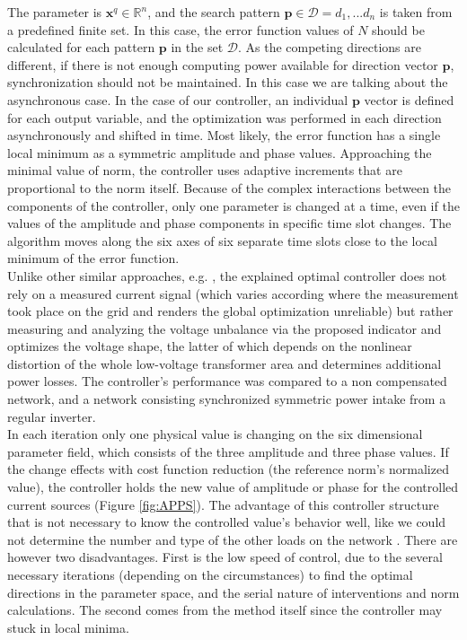         The parameter is $\textbf{x}^q\in\mathbb{R}^n$, and the  search pattern $\textbf{p}\in\mathcal{D}={d_1,...d_n}$ is taken from a predefined finite set. In this case, the error function values of $N$ should be calculated for each pattern $\textbf{p}$ in the set $\mathcal{D}$. As the competing directions are different, if there is not enough computing power available for direction vector $\textbf{p}$, synchronization should not be maintained. In this case we are talking about the asynchronous case. In the case of our controller, an individual $\textbf{p}$ vector is defined for each output variable, and the optimization was performed in each direction asynchronously and shifted in time. Most likely, the error function has a single local minimum as a symmetric amplitude and phase values. Approaching the minimal value of norm, the controller uses adaptive increments that are proportional to the norm itself. Because of the complex interactions between the components of the controller, only one parameter is changed at a time, even if the values of the amplitude and phase components in specific time slot changes. The algorithm moves along the six axes of six separate time slots close to the local minimum of the error function.\\
        Unlike other similar approaches, e.g. \cite{segui2007approach}, the explained optimal controller does not rely on a measured current signal (which varies according where the measurement took place on the grid and renders the global optimization unreliable) but rather measuring and analyzing the voltage unbalance via the proposed indicator and optimizes the voltage shape, the latter of which depends on the nonlinear distortion of the whole low-voltage transformer area and determines additional power losses. The controller's performance was compared to a non compensated network, and a network consisting synchronized symmetric power intake from a regular inverter.\\
        In each iteration only one physical value is changing on the six dimensional parameter field, which consists of the three amplitude and three phase values. If the change effects with cost function reduction (the reference norm's normalized value), the controller holds the new value of amplitude or phase for the controlled current sources (Figure \ref{fig:APPS}). The advantage of this controller structure that is not necessary to know the controlled value's behavior well, like we could not determine the number and type of the other loads on the network \cite{Neukirchner2015}. There are however two disadvantages. First is the low speed of control, due to the several necessary iterations (depending on the circumstances) to find the optimal directions in the parameter space, and the serial nature of interventions and norm calculations. The second comes from the method itself since the controller may stuck in local minima.

